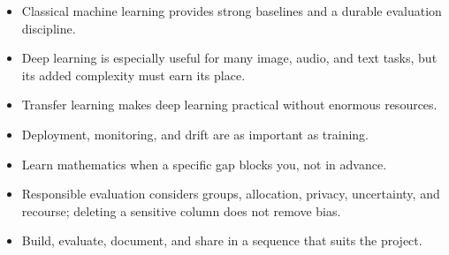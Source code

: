 \begin{chapterrecap}
\begin{itemize}
  \item Classical machine learning provides strong baselines and a durable evaluation discipline.
  \item Deep learning is especially useful for many image, audio, and text tasks, but its added complexity must earn its place.
  \item Transfer learning makes deep learning practical without enormous resources.
  \item Deployment, monitoring, and drift are as important as training.
  \item Learn mathematics when a specific gap blocks you, not in advance.
  \item Responsible evaluation considers groups, allocation, privacy, uncertainty, and recourse; deleting a sensitive column does not remove bias.
  \item Build, evaluate, document, and share in a sequence that suits the project.
\end{itemize}
\end{chapterrecap}
